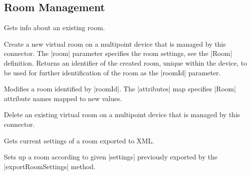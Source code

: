 \subsection{Room Management}
\begin{Api}

Gets info about an existing room.

Create a new virtual room on a multipoint device that is managed by this connector. The |room| parameter specifies the room settings, see the |Room| definition. Returns an identifier of the created room, unique within the device, to be used for further identification of the room as the |roomId| parameter.

Modifies a room identified by |roomId|. The |attributes| map specifies |Room| attribute names mapped to new values.

Delete an existing virtual room on a multipoint device that is managed by this connector.

Gets current settings of a room exported to XML.
\\

Sets up a room according to given |settings| previously exported by the |exportRoomSettings| method.

\end{Api}


